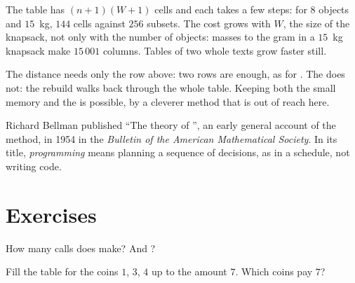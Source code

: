 The table has $(n + 1)(W + 1)$ cells and each takes a few steps: for $8$ objects and $15$~kg, $144$ cells against
$256$ subsets. The cost grows with $W$, the size of the knapsack, not only with the number of objects: masses to the
gram in a $15$~kg knapsack make $15\,001$ columns. Tables of two whole texts grow faster still.

\label{lst:g12:dynamic-programming:sizes}

\label{out:g12:dynamic-programming:sizes}

The distance needs only the row above: two rows are enough, as for . The  does not: the rebuild
walks back through the whole table. Keeping both the small memory and the  is possible, by a cleverer
method that is out of reach here.

\begin{history}[Bellman, 1954]
Richard Bellman published ``The theory of '', an early general account of the method, in 1954 in
the \emph{Bulletin of the American Mathematical Society}. In its title, \emph{programming} means planning a sequence
of decisions, as in a schedule, not writing code.
\end{history}

\section{Exercises}\label{sec:g12:dynamic-programming:exercises}

\begin{exercise}[$\star$]\label{exo:g12:dynamic-programming:1}
How many calls does  make? And ?
\end{exercise}

\begin{exercise}[$\star$]\label{exo:g12:dynamic-programming:2}
Fill the table  for the coins $1$, $3$, $4$ up to the amount $7$. Which coins pay $7$?
\end{exercise}


